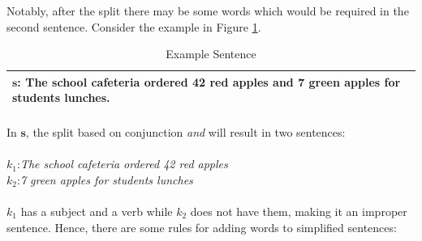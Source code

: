 \documentclass[11pt]{article}
\begin{document}
Notably, after the split there may be some words which would be required in the second sentence. Consider the example in Figure \ref{figure:8}.

\begin{table}[h!]
\centering
\begin{tabular}{ | m{25em} | }
\hline
$\mathbf{s}$: The school cafeteria ordered 42 red apples and 7 green apples for students lunches.\\
\hline
\end{tabular}
\caption{Example Sentence}
\label{figure:8}
\end{table}
\paragraph{}
In $\mathbf{s}$, the split based on conjunction \textit{and} will result in two sentences: \\
\\
$\mathit{k_{1}}$:\textit{The school cafeteria ordered 42 red apples}\\
$\mathit{k_{2}}$:\textit{7 green apples for students lunches}

\paragraph{}
$\mathit{k_{1}}$ has a subject and a verb while $\mathit{k_{2}}$ does not have them, making it an improper sentence. Hence, there are some rules for adding words to simplified sentences:
\end{document}
